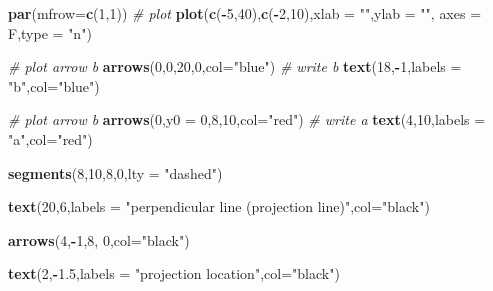 \documentclass[
]{book}
\newenvironment{Shaded}{\begin{snugshade}}{\end{snugshade}}
\newcommand{\CommentTok}[1]{\textcolor[rgb]{0.56,0.35,0.01}{\textit{#1}}}
\newcommand{\DataTypeTok}[1]{\textcolor[rgb]{0.13,0.29,0.53}{#1}}
\newcommand{\DecValTok}[1]{\textcolor[rgb]{0.00,0.00,0.81}{#1}}
\newcommand{\FloatTok}[1]{\textcolor[rgb]{0.00,0.00,0.81}{#1}}
\newcommand{\KeywordTok}[1]{\textcolor[rgb]{0.13,0.29,0.53}{\textbf{#1}}}
\newcommand{\NormalTok}[1]{#1}
\newcommand{\OperatorTok}[1]{\textcolor[rgb]{0.81,0.36,0.00}{\textbf{#1}}}
\newcommand{\StringTok}[1]{\textcolor[rgb]{0.31,0.60,0.02}{#1}}
\theoremstyle{definition}
\theoremstyle{definition}
\theoremstyle{definition}
\theoremstyle{remark}
\begin{document}
\begin{Shaded}
\begin{Highlighting}[]
\KeywordTok{par}\NormalTok{(}\DataTypeTok{mfrow=}\KeywordTok{c}\NormalTok{(}\DecValTok{1}\NormalTok{,}\DecValTok{1}\NormalTok{))}
\CommentTok{# plot}
\KeywordTok{plot}\NormalTok{(}\KeywordTok{c}\NormalTok{(}\OperatorTok{-}\DecValTok{5}\NormalTok{,}\DecValTok{40}\NormalTok{),}\KeywordTok{c}\NormalTok{(}\OperatorTok{-}\DecValTok{2}\NormalTok{,}\DecValTok{10}\NormalTok{),}\DataTypeTok{xlab =} \StringTok{""}\NormalTok{,}\DataTypeTok{ylab =} \StringTok{""}\NormalTok{,}
 \DataTypeTok{axes =}\NormalTok{ F,}\DataTypeTok{type =} \StringTok{"n"}\NormalTok{)}


\CommentTok{# plot arrow b}
\KeywordTok{arrows}\NormalTok{(}\DecValTok{0}\NormalTok{,}\DecValTok{0}\NormalTok{,}\DecValTok{20}\NormalTok{,}\DecValTok{0}\NormalTok{,}\DataTypeTok{col=}\StringTok{"blue"}\NormalTok{)}
\CommentTok{# write b}
\KeywordTok{text}\NormalTok{(}\DecValTok{18}\NormalTok{,}\OperatorTok{-}\DecValTok{1}\NormalTok{,}\DataTypeTok{labels =} \StringTok{"b"}\NormalTok{,}\DataTypeTok{col=}\StringTok{"blue"}\NormalTok{)}


\CommentTok{# plot arrow b}
\KeywordTok{arrows}\NormalTok{(}\DecValTok{0}\NormalTok{,}\DataTypeTok{y0 =} \DecValTok{0}\NormalTok{,}\DecValTok{8}\NormalTok{,}\DecValTok{10}\NormalTok{,}\DataTypeTok{col=}\StringTok{"red"}\NormalTok{)}
\CommentTok{# write a}
\KeywordTok{text}\NormalTok{(}\DecValTok{4}\NormalTok{,}\DecValTok{10}\NormalTok{,}\DataTypeTok{labels =} \StringTok{"a"}\NormalTok{,}\DataTypeTok{col=}\StringTok{"red"}\NormalTok{)}

\KeywordTok{segments}\NormalTok{(}\DecValTok{8}\NormalTok{,}\DecValTok{10}\NormalTok{,}\DecValTok{8}\NormalTok{,}\DecValTok{0}\NormalTok{,}\DataTypeTok{lty =} \StringTok{"dashed"}\NormalTok{)}

\KeywordTok{text}\NormalTok{(}\DecValTok{20}\NormalTok{,}\DecValTok{6}\NormalTok{,}\DataTypeTok{labels =} \StringTok{"perpendicular line (projection line)"}\NormalTok{,}\DataTypeTok{col=}\StringTok{"black"}\NormalTok{)}

\KeywordTok{arrows}\NormalTok{(}\DecValTok{4}\NormalTok{,}\OperatorTok{-}\DecValTok{1}\NormalTok{,}\DecValTok{8}\NormalTok{, }\DecValTok{0}\NormalTok{,}\DataTypeTok{col=}\StringTok{"black"}\NormalTok{)}

\KeywordTok{text}\NormalTok{(}\DecValTok{2}\NormalTok{,}\OperatorTok{-}\FloatTok{1.5}\NormalTok{,}\DataTypeTok{labels =} \StringTok{"projection location"}\NormalTok{,}\DataTypeTok{col=}\StringTok{"black"}\NormalTok{)}
\end{Highlighting}
\end{Shaded}
\end{document}
